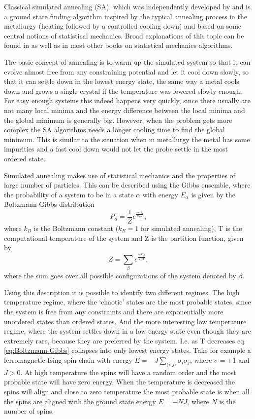 Classical simulated annealing (SA), which was independently developed by \cite{Cerny} and \cite{Kirkpatrick2} is a ground state finding algorithm inspired by the typical annealing process in the metallurgy (heating followed by a controlled cooling down) and based on some central notions of statistical mechanics. Broad explanations of this topic can be found in \cite{SA} as well as in most other books on statistical mechanics algorithms.

The basic concept of annealing is to warm up the simulated system so that it can evolve almost free from any constraining potential and  let it cool down slowly, so that it can settle down in the lowest energy state, the same way a metal cools down and grows a single crystal if the temperature was lowered slowly enough.
For easy enough systems this indeed happens very quickly, since there usually are not many local minima and the energy difference between the local minima and the global minimum is generally big.
However, when the problem gets more complex the SA algorithms needs a longer cooling time to find the global minimum.
This is similar to the situation when in metallurgy the metal has some impurities and a fast cool down would not let the probe settle in the most ordered state.

Simulated annealing makes use of statistical mechanics and the properties of large number of particles. This can be described using the Gibbs ensemble, where the probability of a system to be in a state $\alpha$ with energy $E_\alpha$ is given by the Boltzmann-Gibbs distribution
\begin{equation}\label{eq:Boltzmann-Gibbs}
  P_\alpha = \frac{1}{Z}e^{\frac{-E_\alpha}{k_BT}} \text{,}
\end{equation}
where $k_B$ is the Boltzmann constant ($k_B=1$ for simulated annealing), T is the computational temperature of the system and Z is the partition function, given by
\begin{equation}\label{eq:partition_function}
  Z = \sum_\beta e^{\frac{-E_\beta}{k_BT}} \text{,}
\end{equation}
where the sum goes over all possible configurations of the system denoted by $\beta$.

Using this description it is possible to identify two different regimes.
The high temperature regime, where the `chaotic' states are the most probable states, since the system is free from any constraints and there are exponentially more unordered states than ordered states. And the more interesting low temperature regime, where the system settles down in a low energy state even though they are extremely rare, because they are preferred by the system. I.e. as T decreases eq. \eqref{eq:Boltzmann-Gibbs} collapses into only lowest energy states.
Take for example a ferromagnetic Ising spin chain with energy $E = -J \sum_{\langle i, j \rangle} \sigma_i \sigma_j$, where $\sigma = \pm 1$ and $J>0$.
At high temperature the spins will have a random order and the most probable state will have zero energy.
When the temperature is decreased the spins will align and close to zero temperature the most probable state is when all the spins are aligned with the ground state energy $E=-NJ$, where $N$ is the number of spins.

